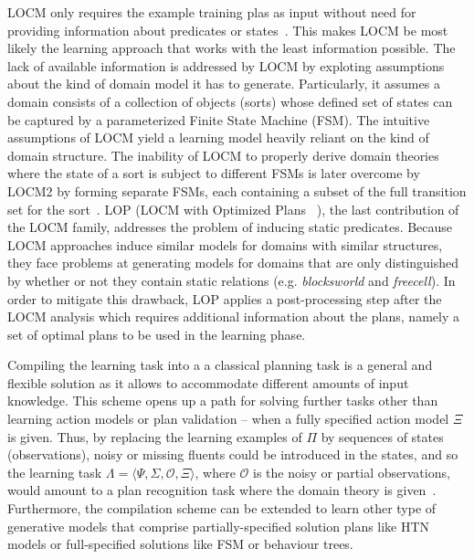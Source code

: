 \documentclass[letterpaper]{article} %
\newcommand{\tup}[1]{{\langle #1 \rangle}}
\begin{document}
{\sf LOCM} only requires the example training plas as input without need for providing information about predicates or states~\cite{cresswell2013acquiring}. This makes {\sf LOCM} be most likely the learning approach that works with the least information possible. The lack of available information is addressed by LOCM by exploting assumptions about the kind of domain model it has to generate. Particularly, it assumes a domain consists of a collection of objects (sorts) whose defined set of states can be captured by a parameterized Finite State Machine (FSM). The intuitive assumptions of {\sf LOCM}
yield a learning model heavily reliant on the kind of domain structure. The inability of {\sf LOCM} to properly derive domain theories where the state of a sort is subject to different FSMs is later overcome by {\sf LOCM2} by forming separate FSMs, each containing a subset of the full transition set for the sort~\cite{cresswell2011generalised}. {\sf LOP} ({\sf LOCM} with Optimized Plans ~\cite{gregory2015domain}), the last contribution of the {\sf LOCM} family, addresses the problem of inducing static predicates. Because {\sf LOCM} approaches induce similar models for domains with similar structures, they face problems at generating models for domains that are only distinguished by whether or not they contain static relations (e.g. {\em blocksworld} and {\em freecell}). In order to mitigate this drawback, {\sf LOP} applies a post-processing step after the {\sf LOCM} analysis which requires additional information about the plans, namely a set of optimal plans to be used in the learning phase.


Compiling the learning task into a a classical planning task is a general and flexible solution as it allows to accommodate different amounts of input knowledge. This scheme opens up a path for solving further tasks other than learning action models or plan validation -- when a fully specified action model $\Xi$ is given. Thus, by replacing the learning examples of $\Pi$ by sequences of states (observations), noisy or missing fluents could be introduced in the states, and so the learning task $\Lambda=\tup{\Psi,\Sigma,\mathcal{O},\Xi}$, where $\mathcal{O}$ is the noisy or partial observations, would amount to a plan recognition task where the domain theory is given~\cite{SohrabiRU16}. Furthermore, the compilation scheme can be extended to learn other type of generative models that comprise partially-specified solution plans like HTN models or full-specified solutions like FSM or behaviour trees.
\end{document}
